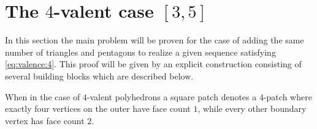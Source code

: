 \section{The $4$-valent case $[3, 5]$}
In this section the main problem will be proven for the case of adding the same number of triangles and pentagons to realize a given sequence satisfying \autoref{eq:valence:4}. This proof will be given by an explicit construction consisting of several building blocks which are described below.

\begin{definition}\label{def:square:patch}
  When in the case of $4$-valent polyhedrons a square patch denotes a $4$-patch where exactly four vertices on the outer have face  count $1$, while every other boundary vertex has face count $2$.
\end{definition}


